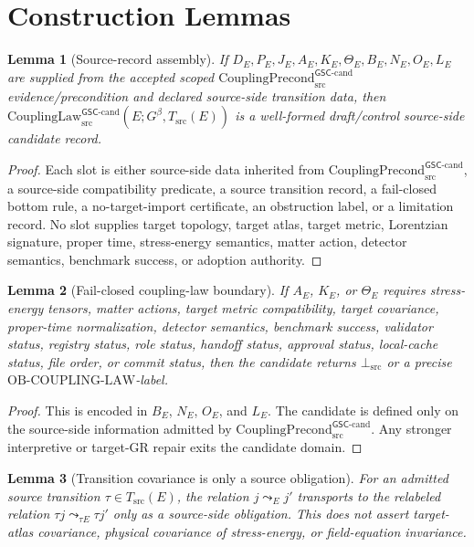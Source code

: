 \documentclass[11pt]{article}
\newcommand{\Gbeta}{G^\beta}
\newcommand{\CouplingPrecond}{\mathrm{CouplingPrecond}^{\mathsf{GSC}\mbox{-}\mathrm{cand}}_{\mathrm{src}}}
\newcommand{\CouplingLaw}{\mathrm{CouplingLaw}^{\mathsf{GSC}\mbox{-}\mathrm{cand}}_{\mathrm{src}}}
\newcommand{\BottomSrc}{\bot_{\mathrm{src}}}
\newcommand{\OBLAW}{\mathrm{OB}\mbox{-}\mathrm{COUPLING}\mbox{-}\mathrm{LAW}}
\newtheorem{lemma}{Lemma}
\begin{document}
\section{Construction Lemmas}

\begin{lemma}[Source-record assembly]
If \(D_E,P_E,J_E,A_E,K_E,\Theta_E,B_E,N_E,O_E,L_E\) are supplied from the
accepted scoped \(\CouplingPrecond\) evidence/precondition and declared
source-side transition data, then
\(\CouplingLaw(E;\Gbeta,T_{\mathrm{src}}(E))\) is a well-formed
draft/control source-side candidate record.
\end{lemma}

\begin{proof}
Each slot is either source-side data inherited from \(\CouplingPrecond\), a
source-side compatibility predicate, a source transition record, a
fail-closed bottom rule, a no-target-import certificate, an obstruction label,
or a limitation record. No slot supplies target topology, target atlas, target
metric, Lorentzian signature, proper time, stress-energy semantics, matter
action, detector semantics, benchmark success, or adoption authority.
\end{proof}

\begin{lemma}[Fail-closed coupling-law boundary]
If \(A_E\), \(K_E\), or \(\Theta_E\) requires stress-energy tensors, matter
actions, target metric compatibility, target covariance, proper-time
normalization, detector semantics, benchmark success, validator status,
registry status, role status, handoff status, approval status, local-cache
status, file order, or commit status, then the candidate returns
\(\BottomSrc\) or a precise \(\OBLAW\)-label.
\end{lemma}

\begin{proof}
This is encoded in \(B_E\), \(N_E\), \(O_E\), and \(L_E\). The candidate is
defined only on the source-side information admitted by
\(\CouplingPrecond\). Any stronger interpretive or target-GR repair exits the
candidate domain.
\end{proof}

\begin{lemma}[Transition covariance is only a source obligation]
For an admitted source transition \(\tau\in T_{\mathrm{src}}(E)\), the
relation \(j\leadsto_E j'\) transports to the relabeled relation
\(\tau j \leadsto_{\tau E} \tau j'\) only as a source-side obligation. This
does not assert target-atlas covariance, physical covariance of stress-energy,
or field-equation invariance.
\end{lemma}
\end{document}
